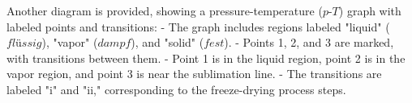 Another diagram is provided, showing a pressure-temperature (\(p\)-\(T\)) graph with labeled points and transitions:  
- The graph includes regions labeled "liquid" (\(flüssig\)), "vapor" (\(dampf\)), and "solid" (\(fest\)).  
- Points 1, 2, and 3 are marked, with transitions between them.  
- Point 1 is in the liquid region, point 2 is in the vapor region, and point 3 is near the sublimation line.  
- The transitions are labeled "i" and "ii," corresponding to the freeze-drying process steps.